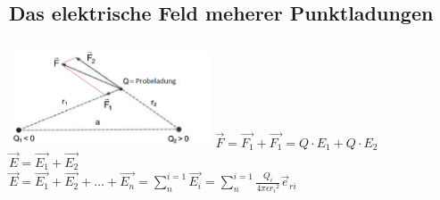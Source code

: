 \subsection{Das elektrische Feld meherer Punktladungen}
\begin{multicols}{2}
\includegraphics[width=6cm]{./pics/f_2pkt_probeladung.png} 
$\vec{F}=\vec{F_1}+\vec{F_1} = Q \cdot E_1 + Q \cdot E_2$\\
$\vec{E}= \vec{E_1} + \vec{E_2}$\\
$\vec{E}= \vec{E_1} + \vec{E_2} + \ldots + \vec{E_n} =
\sum\limits_{n}^{i=1}\vec{E_i}=\sum\limits_{n}^{i=1}\frac{Q_i}{4\pi\epsilon
{r_i}^2}\vec{e}_{ri} $\\
\end{multicols}